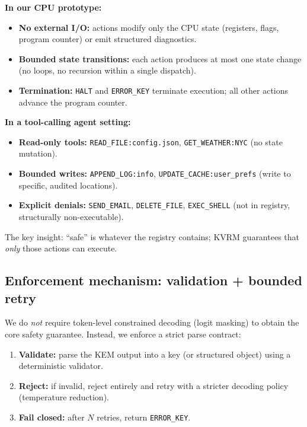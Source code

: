 \documentclass[11pt]{article}
\begin{document}
\textbf{In our CPU prototype:}
\begin{itemize}[leftmargin=*]
  \item \textbf{No external I/O:} actions modify only the CPU state (registers, flags, program counter) or emit structured diagnostics.
  \item \textbf{Bounded state transitions:} each action produces at most one state change (no loops, no recursion within a single dispatch).
  \item \textbf{Termination:} \texttt{HALT} and \texttt{ERROR\_KEY} terminate execution; all other actions advance the program counter.
\end{itemize}

\textbf{In a tool-calling agent setting:}
\begin{itemize}[leftmargin=*]
  \item \textbf{Read-only tools:} \texttt{READ\_FILE:config.json}, \texttt{GET\_WEATHER:NYC} (no state mutation).
  \item \textbf{Bounded writes:} \texttt{APPEND\_LOG:info}, \texttt{UPDATE\_CACHE:user\_prefs} (write to specific, audited locations).
  \item \textbf{Explicit denials:} \texttt{SEND\_EMAIL}, \texttt{DELETE\_FILE}, \texttt{EXEC\_SHELL} (not in registry, structurally non-executable).
\end{itemize}
The key insight: ``safe'' is whatever the registry contains; KVRM guarantees that \emph{only} those actions can execute.

\subsection{Enforcement mechanism: validation + bounded retry}
We do \emph{not} require token-level constrained decoding (logit masking) to obtain the core safety guarantee.
Instead, we enforce a strict parse contract:
\begin{enumerate}[leftmargin=*]
  \item \textbf{Validate:} parse the KEM output into a key (or structured object) using a deterministic validator.
  \item \textbf{Reject:} if invalid, reject entirely and retry with a stricter decoding policy (temperature reduction).
  \item \textbf{Fail closed:} after $N$ retries, return \texttt{ERROR\_KEY}.
\end{enumerate}
\end{document}
